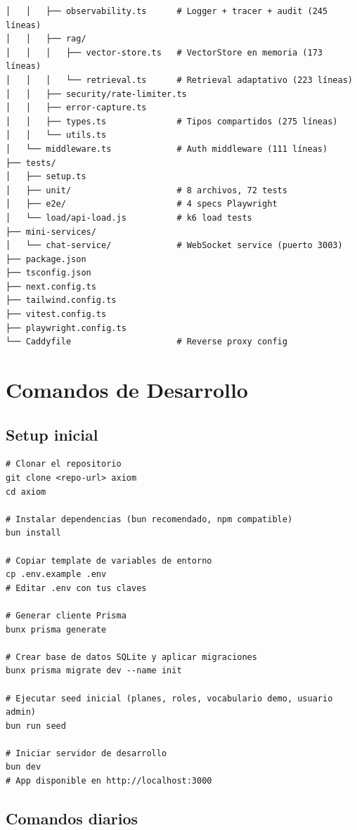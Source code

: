 \documentclass[10pt,a4paper,oneside]{report}
\begin{document}
\begin{lstlisting}[style=bash,caption={Estructura de directorios}]
│   │   ├── observability.ts      # Logger + tracer + audit (245 líneas)
│   │   ├── rag/
│   │   │   ├── vector-store.ts   # VectorStore en memoria (173 líneas)
│   │   │   └── retrieval.ts      # Retrieval adaptativo (223 líneas)
│   │   ├── security/rate-limiter.ts
│   │   ├── error-capture.ts
│   │   ├── types.ts              # Tipos compartidos (275 líneas)
│   │   └── utils.ts
│   └── middleware.ts             # Auth middleware (111 líneas)
├── tests/
│   ├── setup.ts
│   ├── unit/                     # 8 archivos, 72 tests
│   ├── e2e/                      # 4 specs Playwright
│   └── load/api-load.js          # k6 load tests
├── mini-services/
│   └── chat-service/             # WebSocket service (puerto 3003)
├── package.json
├── tsconfig.json
├── next.config.ts
├── tailwind.config.ts
├── vitest.config.ts
├── playwright.config.ts
└── Caddyfile                     # Reverse proxy config
\end{lstlisting}

\chapter{Comandos de Desarrollo}

\section{Setup inicial}

\begin{lstlisting}[style=bash]
# Clonar el repositorio
git clone <repo-url> axiom
cd axiom

# Instalar dependencias (bun recomendado, npm compatible)
bun install

# Copiar template de variables de entorno
cp .env.example .env
# Editar .env con tus claves

# Generar cliente Prisma
bunx prisma generate

# Crear base de datos SQLite y aplicar migraciones
bunx prisma migrate dev --name init

# Ejecutar seed inicial (planes, roles, vocabulario demo, usuario admin)
bun run seed

# Iniciar servidor de desarrollo
bun dev
# App disponible en http://localhost:3000
\end{lstlisting}

\section{Comandos diarios}
\end{document}
